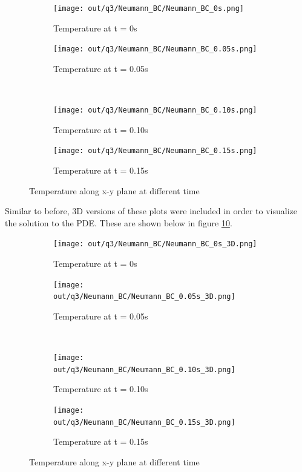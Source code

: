 \documentclass[12pt]{article}
\begin{document}
\begin{figure}[H]
    \centering
    \begin{subfigure}[]{0.48\textwidth}
        \centering
        \texttt{[image: out/q3/Neumann\_BC/Neumann\_BC\_0s.png]}
        \caption{Temperature at t = 0s}
        \label{fig:q3_Neumann_BC_0s_a}
    \end{subfigure}
    \begin{subfigure}[]{0.48\textwidth}
        \centering
        \texttt{[image: out/q3/Neumann\_BC/Neumann\_BC\_0.05s.png]}
        \caption{Temperature at t = 0.05s}
        \label{fig:q3_Neumann_BC_0.05s_a}
    \end{subfigure}
    \\
    \begin{subfigure}[]{0.48\textwidth}
        \centering
        \texttt{[image: out/q3/Neumann\_BC/Neumann\_BC\_0.10s.png]}
        \caption{Temperature at t = 0.10s}
        \label{fig:q3_Neumann_BC_0.10s_a}
    \end{subfigure}
    \begin{subfigure}[]{0.48\textwidth}
        \centering
        \texttt{[image: out/q3/Neumann\_BC/Neumann\_BC\_0.15s.png]}
        \caption{Temperature at t = 0.15s}
        \label{fig:q3_Neumann_BC_0.15s_a}
    \end{subfigure}
    \caption{Temperature along x-y plane at different time}
    \label{fig:q3_plots_c}
\end{figure}

Similar to before, 3D versions of these plots were included in order to visualize the solution to the PDE. These are shown below in figure \ref{fig:q3_plots_d}.

\begin{figure}[H]
    \centering
    \begin{subfigure}[]{0.48\textwidth}
        \centering
        \texttt{[image: out/q3/Neumann\_BC/Neumann\_BC\_0s\_3D.png]}
        \caption{Temperature at t = 0s}
        \label{fig:q3_Neumann_BC_0s_b}
    \end{subfigure}
    \begin{subfigure}[]{0.48\textwidth}
        \centering
        \texttt{[image: out/q3/Neumann\_BC/Neumann\_BC\_0.05s\_3D.png]}
        \caption{Temperature at t = 0.05s}
        \label{fig:q3_Neumann_BC_0.05s_b}
    \end{subfigure}
    \\
    \begin{subfigure}[]{0.48\textwidth}
        \centering
        \texttt{[image: out/q3/Neumann\_BC/Neumann\_BC\_0.10s\_3D.png]}
        \caption{Temperature at t = 0.10s}
        \label{fig:q3_Neumann_BC_0.10s_b}
    \end{subfigure}
    \begin{subfigure}[]{0.48\textwidth}
        \centering
        \texttt{[image: out/q3/Neumann\_BC/Neumann\_BC\_0.15s\_3D.png]}
        \caption{Temperature at t = 0.15s}
        \label{fig:q3_Neumann_BC_0.15s_b}
    \end{subfigure}
    \caption{Temperature along x-y plane at different time}
    \label{fig:q3_plots_d}
\end{figure}
\end{document}
